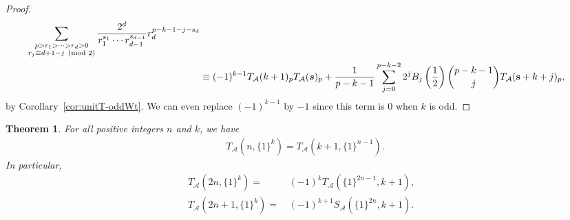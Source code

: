 \documentclass{article}
\newcommand{\bfs}{{\boldsymbol{\sl{s}}}}
\newcommand{\calA}{\mathcal{A}}
\theoremstyle{plain}
\newtheorem{thm}{Theorem}[section]
\theoremstyle{definition}
\begin{document}
\begin{proof}
\begin{align*}
\sum_{\substack{p>r_1>\cdots >r_{d}>0\\r_j\equiv d+1-j\pmod 2}}\frac{2^{d}}{r_1^{s_1}\cdots r_{d-1}^{s_{d-1}}}r_d^{p-k-1-j-s_{d}}\\
&\equiv (-1)^{k-1}T_\calA(k+1)_pT_\calA(\bfs)_p
+\frac{1}{p-k-1}\sum_{j=0}^{p-k-2}2^jB_j\left(\frac12\right)\binom{p-k-1}{j} T_{\calA}(\mathbf s+k+j)_p,
\end{align*}
by Corollary~\ref{cor:unitT-oddWt}. We can even replace $(-1)^{k-1}$ by $-1$ since this term is 0 when $k$ is odd.
\end{proof}


\begin{thm} \label{thm:v-DualReversal}
For all positive integers $n$ and $k$, we have
\begin{align}\label{equ:v-DualRev_n1k}
&T_\calA(n,\{1\}^{k})=T_\calA(k+1,\{1\}^{n-1}).
\end{align}
In particular,
\begin{align} \label{equ:v-DualRevEven-n1k}
T_\calA(2n,\{1\}^{k})=&\, (-1)^{k}T_\calA(\{1\}^{2n-1},k+1),\\
T_\calA(2n+1,\{1\}^k)=&\, (-1)^{k+1}S_\calA(\{1\}^{2n},k+1)  \label{equ:v-DualRevOdd-n1k}.
\end{align}
\end{thm}
\end{document}
